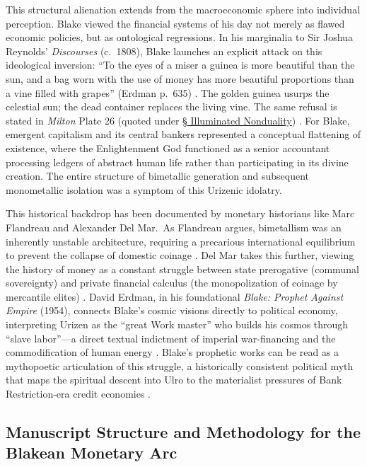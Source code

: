 \documentclass[
]{article}
\begin{document}
This structural alienation extends from the macroeconomic sphere into
individual perception. Blake viewed the financial systems of his day not
merely as flawed economic policies, but as ontological regressions. In
his marginalia to Sir Joshua Reynolds' \emph{Discourses} (c.~1808),
Blake launches an explicit attack on this ideological inversion: ``To
the eyes of a miser a guinea is more beautiful than the sun, and a bag
worn with the use of money has more beautiful proportions than a vine
filled with grapes'' (Erdman p.~635) \citep{blake1808annotations}. The
golden guinea usurps the celestial sun; the dead container replaces the
living vine. The same refusal is stated in \emph{Milton} Plate 26
(quoted under \hyperref[sec-illuminated-nonduality]{§ Illuminated
Nonduality}) \citep{erdman1988complete}. For Blake, emergent capitalism
and its central bankers represented a conceptual flattening of
existence, where the Enlightenment God functioned as a senior accountant
processing ledgers of abstract human life rather than participating in
its divine creation. The entire structure of bimetallic generation and
subsequent monometallic isolation was a symptom of this Urizenic
idolatry.

This historical backdrop has been documented by monetary historians like
Marc Flandreau and Alexander Del Mar.~As Flandreau argues, bimetallism
was an inherently unstable architecture, requiring a precarious
international equilibrium to prevent the collapse of domestic coinage
\citep{flandreau1996bimetallism}. Del Mar takes this further, viewing
the history of money as a constant struggle between state prerogative
(communal sovereignty) and private financial calculus (the
monopolization of coinage by mercantile elites)
\citep{delmar1895history}. David Erdman, in his foundational
\emph{Blake: Prophet Against Empire} (1954), connects Blake's cosmic
visions directly to political economy, interpreting Urizen as the
``great Work master'' who builds his cosmos through ``slave labor''---a
direct textual indictment of imperial war-financing and the
commodification of human energy \citep{erdman1954prophet}. Blake's
prophetic works can be read as a mythopoetic articulation of this
struggle, a historically consistent political myth that maps the
spiritual descent into Ulro to the materialist pressures of Bank
Restriction-era credit economies
\citep{mee2003politics, green2007sublime}.

\subsection{Manuscript Structure and Methodology for the Blakean
Monetary
Arc}\label{manuscript-structure-and-methodology-for-the-blakean-monetary-arc}
\end{document}

